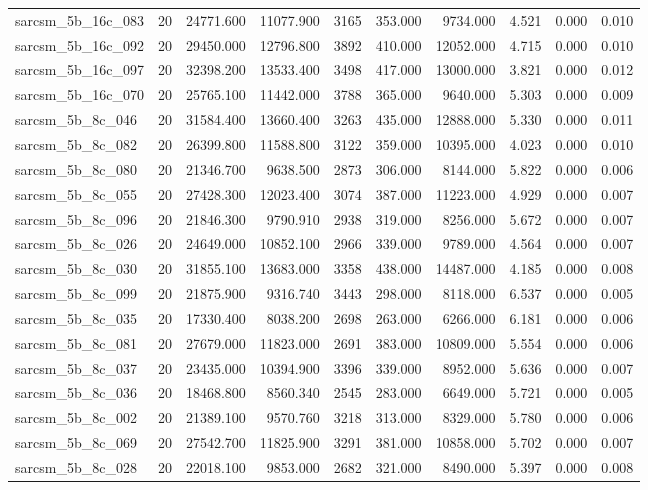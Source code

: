 \begin{tabular}{lrrrrrrrrr}
sarcsm\_5b\_16c\_083 & 20 & 24771.600 & 11077.900 & 3165 & 353.000 & 9734.000 & 4.521 & 0.000 & 0.010 \\
sarcsm\_5b\_16c\_092 & 20 & 29450.000 & 12796.800 & 3892 & 410.000 & 12052.000 & 4.715 & 0.000 & 0.010 \\
sarcsm\_5b\_16c\_097 & 20 & 32398.200 & 13533.400 & 3498 & 417.000 & 13000.000 & 3.821 & 0.000 & 0.012 \\
sarcsm\_5b\_16c\_070 & 20 & 25765.100 & 11442.000 & 3788 & 365.000 & 9640.000 & 5.303 & 0.000 & 0.009 \\
sarcsm\_5b\_8c\_046 & 20 & 31584.400 & 13660.400 & 3263 & 435.000 & 12888.000 & 5.330 & 0.000 & 0.011 \\
sarcsm\_5b\_8c\_082 & 20 & 26399.800 & 11588.800 & 3122 & 359.000 & 10395.000 & 4.023 & 0.000 & 0.010 \\
sarcsm\_5b\_8c\_080 & 20 & 21346.700 & 9638.500 & 2873 & 306.000 & 8144.000 & 5.822 & 0.000 & 0.006 \\
sarcsm\_5b\_8c\_055 & 20 & 27428.300 & 12023.400 & 3074 & 387.000 & 11223.000 & 4.929 & 0.000 & 0.007 \\
sarcsm\_5b\_8c\_096 & 20 & 21846.300 & 9790.910 & 2938 & 319.000 & 8256.000 & 5.672 & 0.000 & 0.007 \\
sarcsm\_5b\_8c\_026 & 20 & 24649.000 & 10852.100 & 2966 & 339.000 & 9789.000 & 4.564 & 0.000 & 0.007 \\
sarcsm\_5b\_8c\_030 & 20 & 31855.100 & 13683.000 & 3358 & 438.000 & 14487.000 & 4.185 & 0.000 & 0.008 \\
sarcsm\_5b\_8c\_099 & 20 & 21875.900 & 9316.740 & 3443 & 298.000 & 8118.000 & 6.537 & 0.000 & 0.005 \\
sarcsm\_5b\_8c\_035 & 20 & 17330.400 & 8038.200 & 2698 & 263.000 & 6266.000 & 6.181 & 0.000 & 0.006 \\
sarcsm\_5b\_8c\_081 & 20 & 27679.000 & 11823.000 & 2691 & 383.000 & 10809.000 & 5.554 & 0.000 & 0.006 \\
sarcsm\_5b\_8c\_037 & 20 & 23435.000 & 10394.900 & 3396 & 339.000 & 8952.000 & 5.636 & 0.000 & 0.007 \\
sarcsm\_5b\_8c\_036 & 20 & 18468.800 & 8560.340 & 2545 & 283.000 & 6649.000 & 5.721 & 0.000 & 0.005 \\
sarcsm\_5b\_8c\_002 & 20 & 21389.100 & 9570.760 & 3218 & 313.000 & 8329.000 & 5.780 & 0.000 & 0.006 \\
sarcsm\_5b\_8c\_069 & 20 & 27542.700 & 11825.900 & 3291 & 381.000 & 10858.000 & 5.702 & 0.000 & 0.007 \\
sarcsm\_5b\_8c\_028 & 20 & 22018.100 & 9853.000 & 2682 & 321.000 & 8490.000 & 5.397 & 0.000 & 0.008 \\

\end{tabular}
